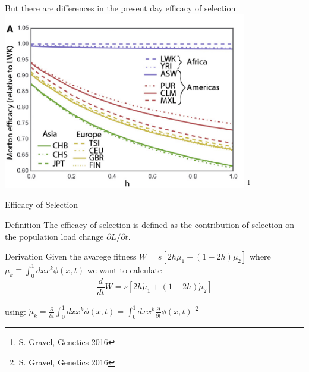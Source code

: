 \documentclass[10pt]{beamer}
\newcommand{\del}[1]{\ensuremath{\frac{\partial}{\partial #1}}}
\begin{document}
\begin{frame}{\normalsize But there are differences in the present day efficacy
    of selection} 
  \vfill
  \centering
  \includegraphics[width=0.8\textwidth]{./Figures/Gravel_efsel.png}
  \let\thefootnote\relax\footnote{S. Gravel, Genetics 2016}
\end{frame}

\begin{frame}{Efficacy of Selection}
  \begin{alertblock}{Definition}
    The efficacy of selection is defined as the contribution of selection on
    the population load change $\partial L / \partial t$.  
  \end{alertblock}
  \begin{block}{Derivation}
    Given the avarege fitness $W = s[2h\mu_1 + (1 - 2h)\mu_2]$ where
    $\mu_k \equiv \int_0^1 dx x^k \phi(x, t)$ we want to calculate 
    \[
      \frac{d}{dt} W= s[2h \dot \mu_1 + (1 - 2h) \dot \mu_2]
    \]
  \end{block}
  using: 
  $\dot \mu_k = \del t \int_0^1 dx x^k \phi(x, t) = \int_0^1 dx x^k \del t \phi(x, t)$
  \let\thefootnote\relax\footnote{S. Gravel, Genetics 2016}
\end{frame}
\end{document}
